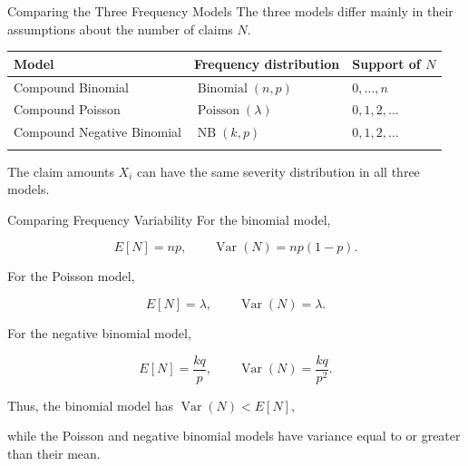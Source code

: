 \documentclass[
  ignorenonframetext,
  aspectratio=169,
]{beamer}
\newcounter{none} %
\begin{document}
\begin{frame}{Comparing the Three Frequency Models}
\protect{}\label{comparing-the-three-frequency-models}
The three models differ mainly in their assumptions about the number of
claims \(N\).

{\def\LTcaptype{none} %
\begin{longtable}[]{@{}
  >{\raggedright\arraybackslash}p{}
  >{\raggedright\arraybackslash}p{}
  >{\raggedright\arraybackslash}p{}@{}}
\toprule\noalign{}
\begin{minipage}[b]{\linewidth}\raggedright
Model
\end{minipage} & \begin{minipage}[b]{\linewidth}\raggedright
Frequency distribution
\end{minipage} & \begin{minipage}[b]{\linewidth}\raggedright
Support of \(N\)
\end{minipage} \\
\midrule\noalign{}
\endhead
Compound Binomial & \(\operatorname{Binomial}(n,p)\) & \(0,\ldots,n\) \\
Compound Poisson & \(\operatorname{Poisson}(\lambda)\) &
\(0,1,2,\ldots\) \\
Compound Negative Binomial & \(\operatorname{NB}(k,p)\) &
\(0,1,2,\ldots\) \\
\bottomrule\noalign{}
\end{longtable}
}

The claim amounts \(X_i\) can have the same severity distribution in all
three models.
\end{frame}

\begin{frame}{Comparing Frequency Variability}
\protect{}\label{comparing-frequency-variability}
For the binomial model,

\[
E[N]=np,
\qquad
\operatorname{Var}(N)=np(1-p).
\]

For the Poisson model,

\[
E[N]=\lambda,
\qquad
\operatorname{Var}(N)=\lambda.
\]

For the negative binomial model,

\[
E[N]=\frac{kq}{p},
\qquad
\operatorname{Var}(N)=\frac{kq}{p^2}.
\]

Thus, the binomial model has \(\operatorname{Var}(N)<E[N],\)

while the Poisson and negative binomial models have variance equal to or
greater than their mean.
\end{frame}
\end{document}

